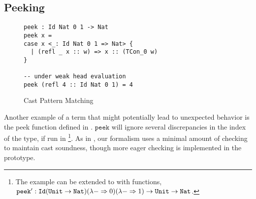 \subsection{Peeking}


\begin{figure}
\begin{lstlisting}[basicstyle=\ttfamily\small]
peek : Id Nat 0 1 -> Nat
peek x =
case x <_: Id Nat 0 1 => Nat> {
  | (refl _ x :: w) => x :: (TCon_0 w)
}

-- under weak head evaluation
peek (refl 4 :: Id Nat 0 1) = 4
\end{lstlisting}
\caption{Cast Pattern Matching}
\label{fig:cast-peek}
\end{figure}

Another example of a term that might potentially lead to unexpected behavior is the peek function defined in .
$\mathtt{peek}$ will ignore several discrepancies in the index of the \Id{} type, if run in \whnf{}\footnote{
  The example can be extended to \cbv{} with functions, 
  $\mathtt{peek'} : \mathtt{Id}{} (\mathtt{Unit} \rightarrow \mathtt{Nat}{}) (\lambda - \Rightarrow 0) (\lambda - \Rightarrow 1)  \rightarrow  \mathtt{Unit} \rightarrow \mathtt{Nat}{}$.
}.
As in , our formalism uses a minimal amount of checking to maintain cast soundness, though more eager checking is implemented in the prototype.